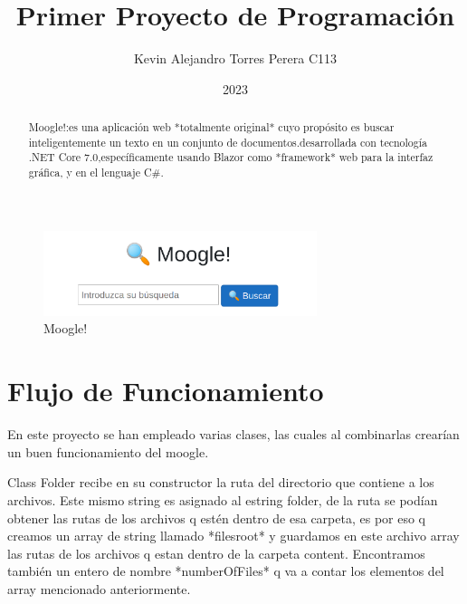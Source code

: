 \documentclass[a4paper,12pt]{article}
\begin{document}
\title{Primer Proyecto de Programación}
\author{Kevin Alejandro Torres Perera C113}
\date{2023}
\maketitle



 \begin{abstract}
 Moogle!:es una aplicación web *totalmente original* cuyo propósito es buscar inteligentemente un texto en un conjunto
de documentos.desarrollada con tecnología .NET Core 7.0,específicamente usando Blazor como *framework* web para la interfaz
gráfica, y en el lenguaje C$\#$.
\end{abstract}

\begin{figure}[h]
	\center
	\includegraphics[width=8cm]{moogle.png}
	\caption{Moogle!}
	\label{fig:logo}
\end{figure}


\section{Flujo de Funcionamiento}

En este proyecto se han empleado varias clases, las cuales al combinarlas crearían un buen funcionamiento del moogle.

Class Folder recibe en su constructor la ruta del directorio que contiene a los archivos. Este mismo string es asignado al estring folder, de la ruta se podían obtener las rutas de los archivos q estén dentro de esa carpeta, es por eso q creamos un array de string llamado *filesroot* y guardamos en este archivo array las rutas de los archivos q estan dentro de la carpeta content. Encontramos también un entero de nombre *numberOfFiles* q va a contar los elementos del array mencionado anteriormente. 
\end{document}
